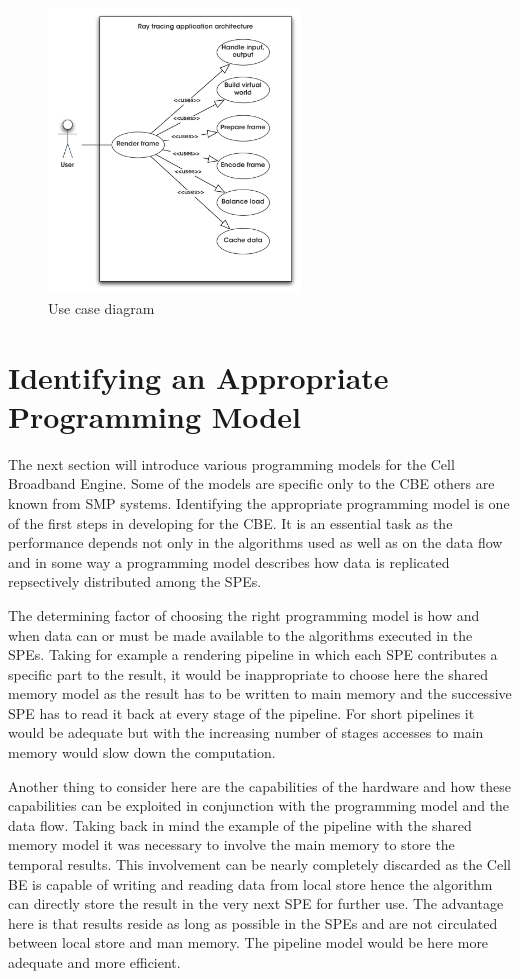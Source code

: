 \documentclass[DIV10, abstracton, openright, footsepline, headsepline, twoside, 9pt,
bigheadings]{scrreprt}
\begin{document}
\begin{figure}[H]
\centering
\includegraphics[width=0.6\textwidth]{diagramme/use-case}
\caption{Use case diagram}
\label{fig:usecasedigarm}
\end{figure}




\newpage
\section{Identifying an Appropriate Programming Model}
\label{sec:analysis_programming_model}
The next section will introduce various programming models for the Cell
Broadband Engine. Some of the models are specific only to the CBE others
are known from SMP systems. Identifying the appropriate programming model
is one of the first steps in developing for the CBE. It is an essential
task as the performance depends not only in the algorithms used as well as
on the data flow and in some way a programming model describes how data
is replicated repsectively distributed among the SPEs.

The determining factor of choosing the right programming model is how and when
 data can or must be made available to the algorithms executed in the SPEs.
Taking for example a rendering pipeline in which each SPE contributes
a specific part to the result, it would be inappropriate to choose here
the shared memory model as the result has to be written to main memory
and the successive SPE has to read it back at every stage of the pipeline. For
short pipelines it would be adequate but with the increasing number of stages
accesses to main memory would slow down the computation.

Another thing to consider here are the capabilities of the hardware and how
these capabilities can be exploited in conjunction with the programming model
and the data flow. Taking back in mind the example of the pipeline with the
shared memory model it was necessary to involve the main memory to store
the temporal results. This involvement can be nearly completely discarded as
the Cell BE is capable of writing and reading data from local store hence
the algorithm can directly store the result in the very next SPE for further
use. The advantage here is that results reside as long as possible in the SPEs
and are not circulated between local store and man memory. The pipeline model
would be here more adequate and more efficient.
\end{document}
